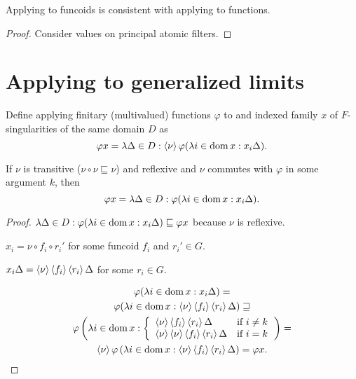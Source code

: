 \begin{prop}
  Applying to funcoids is consistent with applying to functions.
\end{prop}

\begin{proof}
  Consider values on principal atomic filters.
\end{proof}

\section{Applying to generalized limits}

\begin{defn}
  Define applying finitary (multivalued) functions $\varphi$ to and indexed
  family $x$ of $F$-singularities of the same domain $D$ as
  \[ \varphi x = \lambda \Delta \in D : \left\langle \nu\right\rangle \varphi (\lambda i \in
     \operatorname{dom} x : x_i \Delta) . \]
\end{defn}

\begin{prop}
  If $\nu$ is transitive ($\nu \circ \nu \sqsubseteq \nu$) and reflexive and
  $\nu$ commutes with $\varphi$ in some argument $k$, then
  \[ \varphi x = \lambda \Delta \in D : \varphi (\lambda i \in \operatorname{dom} x :
     x_i \Delta) . \]
\end{prop}

\begin{proof}
  $\lambda \Delta \in D : \varphi (\lambda i \in \operatorname{dom} x : x_i \Delta)
  \sqsubseteq \varphi x$ because $\nu$ is reflexive.
  
  $x_i = \nu \circ f_i \circ r_i'$ for some funcoid $f_i$ and $r_i' \in G$.
  
  $x_i \Delta = \left\langle \nu\right\rangle \left\langle f_i \right\rangle \left\langle r_i\right\rangle \Delta$ for some $r_i
  \in G$.
  
  \begin{multline*}\varphi (\lambda i \in \operatorname{dom} x : x_i \Delta) =\\ \varphi (\lambda i \in
  \operatorname{dom} x : \left\langle \nu\right\rangle \left\langle f_i\right\rangle \left\langle r_i\right\rangle \Delta) \sqsupseteq\\
  \varphi \left( \lambda i \in \operatorname{dom} x : \left\{\begin{array}{ll}
    \left\langle \nu\right\rangle \left\langle f_i\right\rangle \left\langle r_i\right\rangle \Delta & \text{if } i \neq k\\
    \left\langle \nu\right\rangle \left\langle \nu\right\rangle \left\langle f_i\right\rangle \left\langle r_i\right\rangle \Delta & \text{if } i =
    k
  \end{array}\right. \right) =\\ \left\langle \nu\right\rangle \varphi \left( \lambda i \in
  \operatorname{dom} x : \left\langle \nu\right\rangle \left\langle f_i\right\rangle \left\langle r_i\right\rangle \Delta \right) =
  \varphi x.\end{multline*}
\end{proof}

